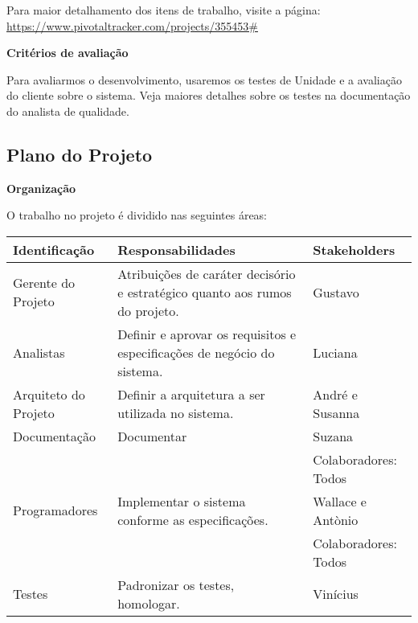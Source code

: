 \documentclass[12pt,letterpaper]{article}
\begin{document}
\bigskip

Para maior detalhamento dos itens de trabalho, visite a página: 
\url{https://www.pivotaltracker.com/projects/355453#}

\vspace{1cm}
{\large {\bf Critérios de avaliação}}
\vspace{0.5cm}

Para avaliarmos o desenvolvimento, usaremos os testes de Unidade e a avaliação do cliente sobre o sistema.
Veja maiores detalhes sobre os testes na documentação do analista de qualidade.

\pagebreak
\subsection{Plano do Projeto}


\vspace{1cm}
{\large {\bf Organização}}
\vspace{0.5cm}

O trabalho no projeto é dividido nas seguintes áreas:


\begin{table}[ht!]
\begin{small} %
    \begin{tabular}{| l | p{7cm} | p{5cm} |}
    \hline
    Identificação & Responsabilidades & Stakeholders\\
    \hline
    \hline
    Gerente do Projeto &
    Atribuições de caráter decisório e estratégico quanto aos rumos do projeto. &
    Gustavo\\
    \hline
    Analistas &
    Definir e aprovar os requisitos e especificações de negócio do sistema. &
    Luciana\\
    \hline
    Arquiteto do Projeto &
    Definir a arquitetura a ser utilizada no sistema. &
    André e Susanna\\
    \hline
    Documentação &
    Documentar &
    Suzana\\
    & & Colaboradores: Todos\\
    \hline
    Programadores &
    Implementar o sistema conforme as especificações. &
    Wallace e Antònio\\
    & & Colaboradores: Todos\\
    \hline
    Testes &
    Padronizar os testes, homologar. &
    Vinícius\\
    \hline
    \end{tabular}
\end{small}
\end{table}
\end{document}

